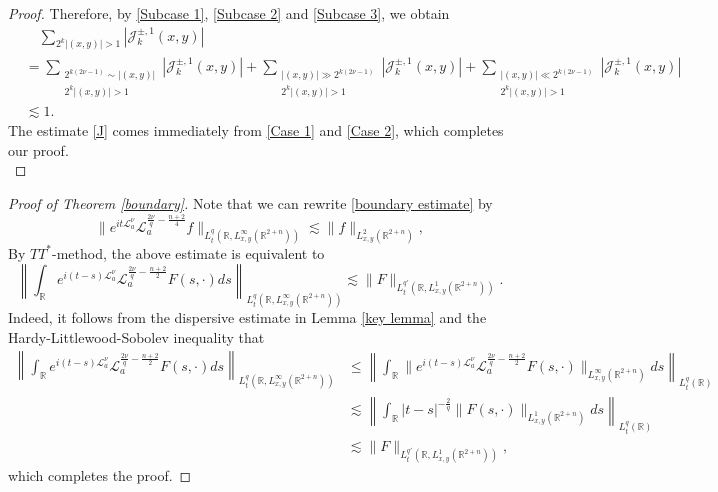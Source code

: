 \documentclass[a4paper,11pt, reqno]{amsart}
\numberwithin{equation}{section}
\theoremstyle{plain}
\theoremstyle{definition}
\theoremstyle{remark}
\begin{document}
\begin{proof}
Therefore, by \eqref{Subcase 1}, \eqref{Subcase 2} and \eqref{Subcase 3}, we obtain
\begin{equation}\label{Case 2}
\begin{aligned}
&\quad\sum_{2^k|(x,y)|>1}|\mathcal{J}_k^{\pm,1}(x,y)|\\
&=\sum_{\substack{2^{k(2\nu-1)}\sim |(x,y)|\\ 2^k|(x,y)|>1}}|\mathcal{J}_k^{\pm,1}(x,y)|+\sum_{\substack{|(x,y)|\gg 2^{k(2\nu-1)}\\ 2^k|(x,y)|>1}}|\mathcal{J}_k^{\pm,1}(x,y)|+\sum_{\substack{|(x,y)|\ll 2^{k(2\nu-1)}\\ 2^k|(x,y)|>1}}|\mathcal{J}_k^{\pm,1}(x,y)|\\
&\lesssim 1.
\end{aligned}
\end{equation}
The estimate \eqref{J} comes immediately from \eqref{Case 1} and \eqref{Case 2}, which completes our proof.\\
\end{proof}

\begin{proof}[Proof of Theorem \ref{boundary}] Note that we can rewrite  \eqref{boundary estimate} by
\begin{equation*}
\|e^{it\mathcal{L}_a^\nu} \mathcal{L}_a^{\frac{2\nu}{q}-\frac{n+2}{4}} f\|_{L_t^q(\mathbb{R},L_{x,y}^\infty(\mathbb{R}^{2+n}))}\lesssim \|f\|_{L_{x,y}^2(\mathbb{R}^{2+n})},
\end{equation*}
By $TT^*$-method, the above estimate is equivalent to
\begin{equation*}
\left\|\int_\mathbb{R} e^{i(t-s)\mathcal{L}_a^\nu}\mathcal{L}_a^{\frac{2\nu}{q}-\frac{n+2}{2}} F(s,\cdot)ds\right\|_{L_t^q(\mathbb{R},L_{x,y}^\infty(\mathbb{R}^{2+n}))}\lesssim \|F\|_{L_t^{q'}(\mathbb{R},L_{x,y}^1(\mathbb{R}^{2+n}))}.
\end{equation*}
Indeed, it follows from the dispersive estimate in Lemma \ref{key lemma} and the Hardy-Littlewood-Sobolev inequality that
\begin{align*}
\left\|\int_\mathbb{R} e^{i(t-s)\mathcal{L}_a^\nu}\mathcal{L}_a^{\frac{2\nu}{q}-\frac{n+2}{2}} F(s,\cdot)ds\right\|_{L_t^q(\mathbb{R},L_{x,y}^\infty(\mathbb{R}^{2+n}))}&\leq \left\|\int_\mathbb{R} \|e^{i(t-s)\mathcal{L}_a^\nu}\mathcal{L}_a^{\frac{2\nu}{q}-\frac{n+2}{2}} F(s,\cdot)\|_{L_{x,y}^\infty(\mathbb{R}^{2+n})}ds\right\|_{L_t^q(\mathbb{R})}\\
&\lesssim \left\|\int_\mathbb{R} |t-s|^{-\frac{2}{q}}\|F(s,\cdot)\|_{L_{x,y}^1(\mathbb{R}^{2+n})}ds\right\|_{L_t^q(\mathbb{R})}\\
&\lesssim \|F\|_{L_t^{q'}(\mathbb{R},L_{x,y}^1(\mathbb{R}^{2+n}))},
\end{align*}
which completes the proof. 
\end{proof}
\end{document}
